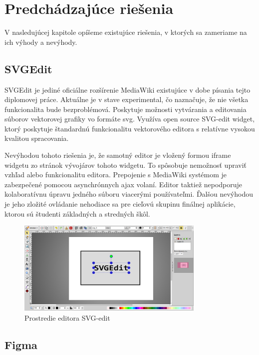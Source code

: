 \chapter{Predchádzajúce riešenia}\label{chap:previous_solutions}

V nasledujúcej kapitole opíšeme existujúce riešenia, v ktorých sa zameriame na ich výhody a nevýhody.

\section{SVGEdit}

SVGEdit je jediné oficiálne rozšírenie MediaWiki existujúce v dobe písania tejto diplomovej práce. Aktuálne je v stave experimental, čo naznačuje, že nie všetka funkcionalita bude bezproblémová. Poskytuje možnosti vytvárania a editovania súborov vektorovej grafiky vo formáte svg. Využíva open source SVG-edit widget, ktorý poskytuje štandardnú funkcionalitu vektorového editora s relatívne vysokou kvalitou spracovania. 

Nevýhodou tohoto riešenia je, že samotný editor je vložený formou iframe widgetu zo stránok vývojárov tohoto widgetu. To spôsobuje nemožnosť upraviť vzhľad alebo funkcionalitu editora. Prepojenie s MediaWiki systémom je zabezpečené pomocou asynchrónnych ajax volaní. Editor taktiež nepodporuje kolaboratívnu úpravu jedného súboru viacerými používateľmi. Ďalšou nevýhodou je jeho zložité ovládanie nehodiace sa pre cieľovú skupinu finálnej aplikácie, ktorou sú študenti základných a stredných škôl.

\begin{figure}[h]
	\centerline{\includegraphics[width=0.8\textwidth]{images/svg-edit}}
	\caption[Editor SVG-edit]{Prostredie editora SVG-edit}
	\label{obr:SVGedit}
\end{figure}
\FloatBarrier


\section{Figma}

